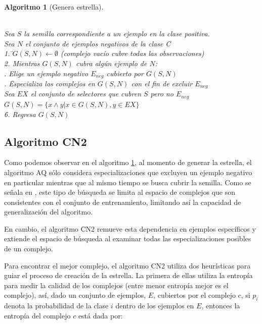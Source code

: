 \documentclass[12pt]{report}
\theoremstyle{break}
\theoremstyle{break}
\newtheorem{algoritmo}{Algoritmo}[chapter]
\begin{document}
\begin{algoritmo}[Genera estrella]
\begin{tabbing}
\\Sea $S$ la semilla correspondiente a un ejemplo en la clase positiva.
\\Sea $N$ el conjunto de ejemplos negativos de la clase C\\
1. \=$G(S,N)\leftarrow \emptyset$ (complejo vacío cubre todas las observaciones) \\
2. Mientras $G(S,N)$ cubra algún ejemplo de $N$:\\
 . Elige un ejemplo negativo $E_{neg}$ cubierto por $G(S,N)$\\
 . \= Especializa los complejos en $G(S,N)$ con el fin de excluir $E_{neg}$\\
 \> Sea $EX$ el conjunto de selectores que cubren $S$ pero no $E_{neg}$ \\
 \> $G(S,N)=\{x \wedge y \vert x \in G(S,N), y \in EX \}$\\
\=6. Regresa $G(S,N)$
\end{tabbing}
\label{algo:AQ genera estrella}
\end{algoritmo}

\subsection{Algoritmo CN2}
\label{subseccion:algoritmo cn2}
Como podemos observar en el algoritmo \ref{algo:AQ genera estrella}, al momento de generar la estrella, el algoritmo AQ sólo considera especializaciones que excluyen un ejemplo negativo en particular mientras que al mismo tiempo se busca cubrir la semilla. Como se señala en \cite{CN2-Clark1989}, este tipo de búsqueda se limita al espacio de complejos que son consistentes con el conjunto de entrenamiento, limitando así la capacidad de generalización del algoritmo.

En cambio, el algoritmo CN2 remueve esta dependencia en ejemplos específicos y extiende el espacio de búsqueda al examinar todas las especializaciones posibles de un complejo.

Para encontrar el mejor complejo, el algoritmo CN2 utiliza dos heurísticas para guiar el proceso de creación de la estrella. La primera de ellas utiliza la entropía para medir la calidad de los complejos (entre menor entropía mejor es el complejo), así, dado un conjunto de ejemplos, $E$, cubiertos por el complejo $c$, si $p_i$ denota la probabilidad de la clase $i$ dentro de los ejemplos en $E$, entonces la entropía del complejo $c$ está dada por:
\end{document}

